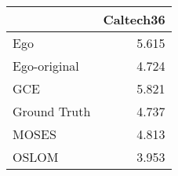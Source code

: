 \begin{tabular}{lr}
\toprule
{} & Caltech36 \\
\midrule
Ego          &     5.615 \\
Ego-original &     4.724 \\
GCE          &     5.821 \\
Ground Truth &     4.737 \\
MOSES        &     4.813 \\
OSLOM        &     3.953 \\
\bottomrule
\end{tabular}

